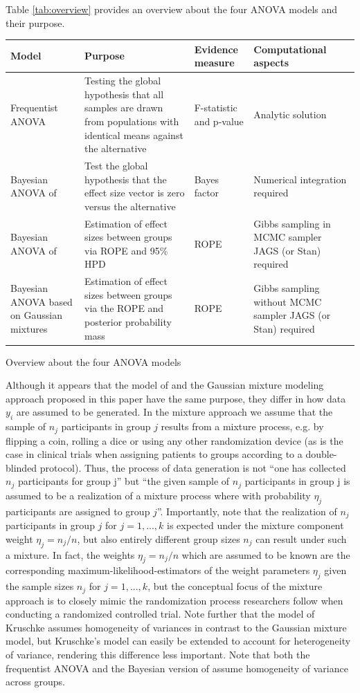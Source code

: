 Table \ref{tab:overview} provides an overview about the four ANOVA models and their purpose.
\begin{widetable}[t!]
\centering
\begin{tabular}{p{3.00cm}p{5.25cm}p{1.50cm}p{2.750cm}}
\toprule
Model           & Purpose & Evidence measure & Computational aspects\\
\midrule
Frequentist ANOVA & Testing the global hypothesis that all samples are drawn from populations with identical means against the alternative & F-statistic and p-value & Analytic solution\\
Bayesian ANOVA of \cite{Rouder2012} & Test the global hypothesis that the effect size vector is zero versus the alternative & Bayes factor & Numerical integration required\\
Bayesian ANOVA of \cite{Kruschke2015} & Estimation of effect sizes between groups via ROPE and 95\% HPD & ROPE & Gibbs sampling in MCMC sampler JAGS (or Stan) required \\
Bayesian ANOVA based on Gaussian mixtures & Estimation of effect sizes between groups via the ROPE and posterior probability mass & ROPE & Gibbs sampling without MCMC sampler JAGS (or Stan) required\\
\bottomrule
\end{tabular}
\caption{\label{tab:overview} Overview about the four ANOVA models}
\end{widetable}
Although it appears that the model of \cite{Kruschke2015} and the Gaussian mixture modeling approach proposed in this paper have the same purpose, they differ in how data $y_i$ are assumed to be generated. In the mixture approach we assume that the sample of $n_j$ participants in group $j$ results from a mixture process, e.g. by flipping a coin, rolling a dice or using any other randomization device (as is the case in clinical trials when assigning patients to groups according to a double-blinded protocol). Thus, the process of data generation is not ``one has collected $n_j$ participants for group j'' but ``the given sample of $n_j$ participants in group j is assumed to be a realization of a mixture process where with probability $\eta_j$ participants are assigned to group $j$''. Importantly, note that the realization of $n_j$ participants in group $j$ for $j=1,...,k$ is expected under the mixture component weight $\eta_j=n_j/n$, but also entirely different group sizes $n_j$ can result under such a mixture. In fact, the weights $\eta_j=n_j/n$ which are assumed to be known are the corresponding maximum-likelihood-estimators of the weight parameters $\eta_j$ given the sample sizes $n_j$ for $j=1,...,k$, but the conceptual focus of the mixture approach is to closely mimic the randomization process researchers follow when conducting a randomized controlled trial. Note further that the model of Kruschke assumes homogeneity of variances in contrast to the Gaussian mixture model, but Kruschke's model can easily be extended to account for heterogeneity of variance, rendering this difference less important. Note that both the frequentist ANOVA and the Bayesian version of \cite{Rouder2012} assume homogeneity of variance across groups.

